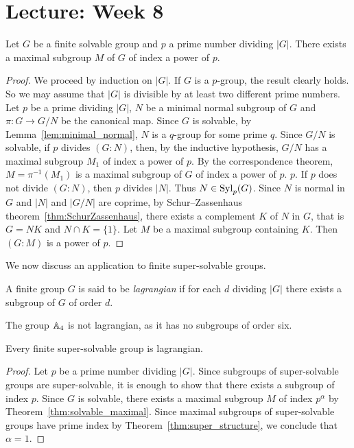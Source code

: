 \section{Lecture: Week 8}

\begin{theorem}
	\label{thm:solvable_maximal}
	Let $G$ be a finite solvable group and $p$ a prime number dividing $|G|$. There exists a maximal 
    subgroup $M$ of $G$ of index a power of $p$. 
\end{theorem}

\begin{proof}
	We proceed by induction on $|G|$. If $G$ is a $p$-group, the result clearly holds. So we may assume that $|G|$ is divisible by at least two different prime numbers. 
    Let $p$ be a prime dividing $|G|$, $N$ be a minimal normal subgroup of $G$ and 
    $\pi\colon G\to G/N$ be the canonical map. Since $G$ is solvable, by Lemma~\ref{lem:minimal_normal}, 
    $N$ is a $q$-group for some prime $q$. Since $G/N$ is solvable, if $p$ divides 
	$(G:N)$, then, by the inductive hypothesis, $G/N$ has a maximal subgroup 
 	$M_1$ of index a power of $p$. By the correspondence theorem, 
  $M=\pi^{-1}(M_1)$ is a maximal subgroup of $G$ of index a power of $p$. 
  $p$. If $p$ does not divide $(G:N)$, then $p$ divides $|N|$. Thus 
	$N\in\mathrm{Syl}_p(G)$. Since $N$ is normal in $G$ and $|N|$ and $|G/N|$ are coprime, by 
	Schur--Zassenhaus theorem~\ref{thm:SchurZassenhaus}, 
	there exists a complement $K$ of $N$ in $G$, that is $G=NK$ and $N\cap K=\{1\}$. Let 
	$M$ be a maximal subgroup containing $K$. Then $(G:M)$ is a power of $p$. 
\end{proof}

We now discuss an application to finite super-solvable groups. 

\begin{definition}
	A finite group $G$ is said to be \emph{lagrangian} if for each $d$ dividing $|G|$ 
	there exists a subgroup of $G$ of order $d$.
\end{definition}

The group $\mathbb{A}_4$ is not lagrangian, as it has no subgroups of order six. 

\begin{theorem}
	Every finite super-solvable group is lagrangian. 
\end{theorem}

\begin{proof}
	Let $p$ be a prime number dividing $|G|$. Since subgroups of super-solvable groups are super-solvable, it is enough to 
    show that there exists a subgroup of index $p$. 
	Since $G$ is solvable, there exists a maximal subgroup $M$ of index 
	$p^{\alpha}$ by Theorem~\ref{thm:solvable_maximal}. Since maximal 
 subgroups of super-solvable groups have prime index 
    by Theorem~\ref{thm:super_structure}, we conclude that $\alpha=1$.
\end{proof}

